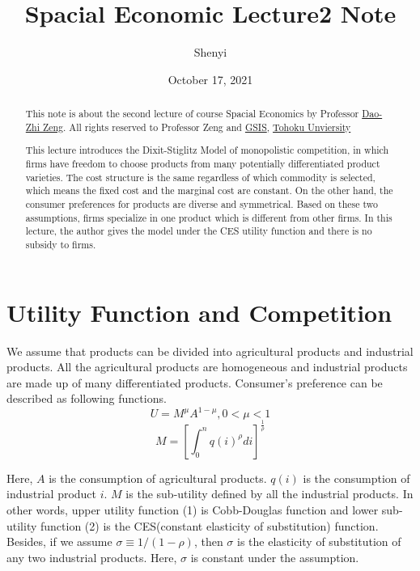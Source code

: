 \documentclass{article}
\title{Spacial Economic Lecture2 Note}
\author{Shenyi}
\date{October 17, 2021}
\begin{document}
\maketitle
\begin{abstract}

This note is about the second lecture of course Spacial Economics by Professor \href{http://www.se.is.tohoku.ac.jp/~zeng/eng.html}{Dao-Zhi Zeng}. All rights reserved to Professor Zeng and \href{https://www.is.tohoku.ac.jp/en/}{GSIS}, \href{http://www.tohoku.ac.jp/en/}{Tohoku Unviersity}

This lecture introduces the Dixit-Stiglitz Model of monopolistic competition, in which firms have freedom to choose products from many potentially differentiated product varieties. The cost structure is the same regardless of which commodity is selected, which means the fixed cost and the marginal cost are constant. On the other hand, the consumer preferences for products are diverse and symmetrical. Based on these two assumptions, firms specialize in one product which is different from other firms. In this lecture, the author gives the model under the CES utility function and there is no subsidy to firms.

\end{abstract}

\section{Utility Function and Competition}
We assume that products can be divided into agricultural products and industrial products. All the agricultural products are homogeneous and industrial products are made up of many differentiated products. Consumer's preference can be described as following functions.
\begin{equation}
    U = M^{\mu}A^{1-\mu},0<{\mu}<1 
\end{equation}
\begin{equation}
    M=[\int_0^n q(i)^{\rho}di]^{\frac{1}{\rho}} 
\end{equation}

Here, $A$ is the consumption of agricultural products. $q(i)$ is the consumption of industrial product $i$. $M$ is the sub-utility defined by all the industrial products. In other words, upper utility function (1) is Cobb-Douglas function and lower sub-utility function (2) is the CES(constant elasticity of substitution) function. Besides, if we assume $\sigma \equiv 1/(1- \rho)$, then $\sigma$ is the elasticity of substitution of any two industrial products. Here, $\sigma$ is constant under the assumption.
\end{document}

